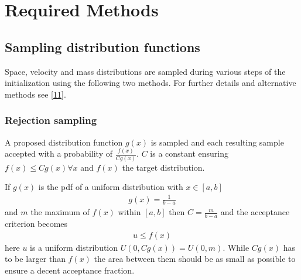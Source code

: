 \documentclass[letterpaper,10pt,english]{sphinxmanual}
\begin{document}
	\chapter{Required Methods}
		\section{Sampling distribution functions}
			\label{\detokenize{NBodySimulation/Initialization:sampling-distribution-functions}}
			Space, velocity and mass distributions are sampled during various steps of the initialization using the following two methods.
			For further details and alternative methods see {[}\hyperlink{cite.NBodySimulation/Appendix:id43}{11}{]}.
				\subsection{Rejection sampling}
					\label{\detokenize{NBodySimulation/Initialization:rejection-sampling}}
					\sphinxAtStartPar
					A proposed distribution function \(g(x)\) is sampled and each resulting sample accepted with a probability of \(\frac{f(x)}{Cg(x)}\).
					\(C\) is a constant ensuring \(f(x)\leqslant Cg(x) \forall x\) and \(f(x)\) the target distribution.
			
					\sphinxAtStartPar
					If \(g(x)\) is the pdf of a uniform distribution with \(x \in \left [ a,b \right ]\)
					\begin{equation*}
					\begin{split}g(x)=\frac{1}{b-a}\end{split}
					\end{equation*}
					\sphinxAtStartPar
					and \(m\) the maximum of \(f(x)\) within \(\left [ a,b \right ]\) then \(C=\frac{m}{b-a}\) and the acceptance criterion becomes
					\begin{equation*}
					\begin{split}u \leq f(x)\end{split}
					\end{equation*}
					\sphinxAtStartPar
					here \(u\) is a uniform distribution \(U(0,Cg(x)) = U(0,m)\). While \(Cg(x)\) has to be larger than \(f(x)\) the area between them should be as small as possible to ensure a decent acceptance fraction.
				
\end{document}
